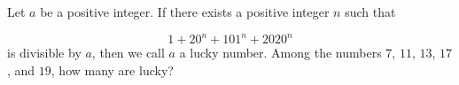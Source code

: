 Let $a$ be a positive integer. If there exists a positive integer $n$ such that

\[
1+20^n+101^n+2020^n
\]is divisible by $a$, then we call $a$ a lucky number. Among the numbers $7$, $11$, $13$, $17$, and $19$, how many are lucky?
